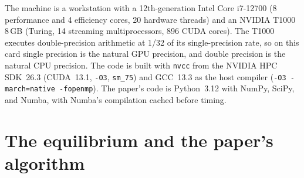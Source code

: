 \documentclass[11pt]{article}
\begin{document}
The machine is a workstation with a 12th-generation Intel Core i7-12700 (8 performance and 4 efficiency cores, 20 hardware threads) and an NVIDIA T1000 8\,GB (Turing, 14 streaming multiprocessors, 896 CUDA cores). The T1000 executes double-precision arithmetic at 1/32 of its single-precision rate, so on this card single precision is the natural GPU precision, and double precision is the natural CPU precision. The code is built with \texttt{nvcc} from the NVIDIA HPC SDK~26.3 (CUDA~13.1, \texttt{-O3}, \texttt{sm\_75}) and GCC~13.3 as the host compiler (\texttt{-O3 -march=native -fopenmp}). The paper's code is Python~3.12 with NumPy, SciPy, and Numba, with Numba's compilation cached before timing.

\section{The equilibrium and the paper's algorithm}
\end{document}
